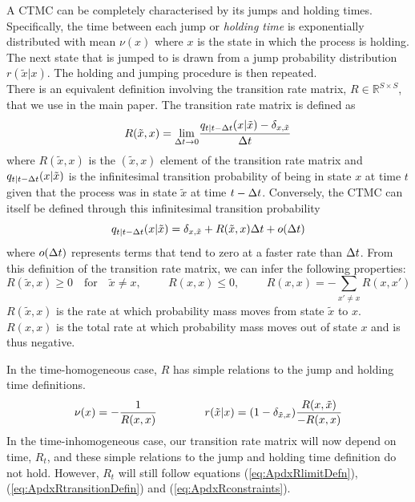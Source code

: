 \documentclass{article}
\begin{document}
A CTMC can be completely characterised by its jumps and holding times. Specifically, the time between each jump or \textit{holding time} is exponentially distributed with mean $\nu(x)$ where $x$ is the state in which the process is holding. The next state that is jumped to is drawn from a jump probability distribution $r(\tilde{x} | x)$. The holding and jumping procedure is then repeated.\\


There is an equivalent definition involving the transition rate matrix,
$R \in \mathbb{R}^{S \times S}$, that we use in the main paper. The transition
rate matrix is defined as
\begin{equation}
    R(\tilde{x},  x) = \underset{\Delta t \rightarrow 0}{\text{lim}} \frac{q_{t|t-\Delta t}(x | \tilde{x}) - \delta_{x, \tilde{x}}}{\Delta t}
    \label{eq:ApdxRlimitDefn}
\end{equation}
where $R(\tilde{x}, x)$ is the $(\tilde{x}, x)$ element of the transition rate matrix and $q_{t|t-\Delta t}(x | \tilde{x})$ is the infinitesimal transition probability of being in state $x$ at time $t$ given that the process was in state $\tilde{x}$ at time $t-\Delta t$. Conversely, the CTMC can itself be defined through this infinitesimal transition probability
\begin{equation}
    q_{t|t-\Delta t}(x | \tilde{x}) = \delta_{x, \tilde{x}} + R(\tilde{x}, x) \Delta t + o(\Delta t) \label{eq:ApdxRtransitionDefin}
\end{equation}
where $o(\Delta t)$ represents terms that tend to zero at a faster rate than $\Delta t$. From this definition of the transition rate matrix, we can infer the following properties:
\begin{equation}
\textstyle     R(\tilde{x}, x) \geq 0 \quad \text{for} \quad \tilde{x} \neq x, \hspace{1cm} R(x, x) \leq 0, \hspace{1cm} R(x, x) = - \sum_{x' \neq x} R(x, x')
\label{eq:ApdxRconstraints}
\end{equation}
$R(\tilde{x}, x)$ is the rate at which probability mass moves from state $\tilde{x}$ to $x$. $R(x, x)$ is the total rate at which probability mass moves out of state $x$ and is thus negative.

In the time-homogeneous case, $R$ has simple relations to the jump and holding time definitions.
\begin{equation}
    \nu(x) = - \frac{1}{R(x, x)} \hspace{1.5cm} r(\tilde{x} | x) = ( 1 - \delta_{\tilde{x}, x}) \frac{R(x, \tilde{x})}{- R(x, x)}
\end{equation}
In the time-inhomogeneous case, our transition rate matrix will now depend on time, $R_t$, and these simple relations to the jump and holding time definition do not hold. However, $R_t$ will still follow equations (\ref{eq:ApdxRlimitDefn}), (\ref{eq:ApdxRtransitionDefin}) and (\ref{eq:ApdxRconstraints}).\\
\end{document}
